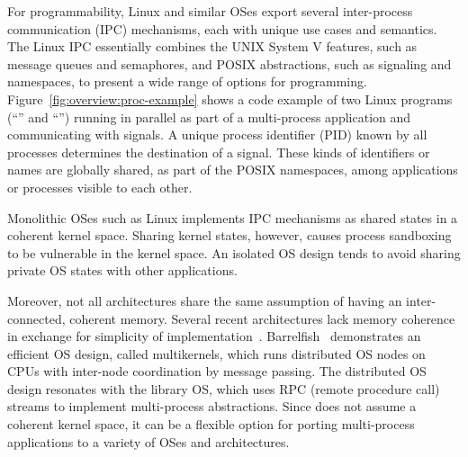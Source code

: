 For programmability, Linux and similar OSes export several inter-process communication (IPC) mechanisms,
each with unique use cases and semantics.
The Linux IPC essentially combines the UNIX System V features, such as message queues and semaphores,
and POSIX abstractions, such as signaling and namespaces,
to present a wide range of options for programming.
Figure~\ref{fig:overview:proc-example} shows a code example of
two Linux programs (``'' and ``'')
running in parallel as part of a multi-process application and communicating with signals.
A unique process identifier (PID)
known by all processes determines the destination of a signal.
These kinds of identifiers or names are globally shared, as part of the POSIX namespaces,
among applications or processes visible to each other.




Monolithic OSes such as Linux implements IPC mechanisms as shared states in a coherent kernel space.
Sharing kernel states, however, causes process sandboxing
to be vulnerable in the kernel space.
An isolated OS design tends to avoid sharing private OS states with other applications.


Moreover, not all architectures share the same assumption of having an inter-connected, coherent memory.
Several recent architectures lack memory coherence
in exchange for simplicity of implementation~\cite{gschwind2007,cascaval2002evaluation}.
Barrelfish~\cite{baumann09barrelfish} demonstrates an efficient OS design, called multikernels, which runs distributed OS nodes on CPUs with inter-node coordination by message passing.
The distributed OS design resonates with the \graphene{} library OS, which uses RPC (remote procedure call) streams to implement multi-process abstractions.
Since \graphene{} does not assume a coherent kernel space, it can be a flexible option
for porting multi-process applications to a variety of OSes and architectures.



